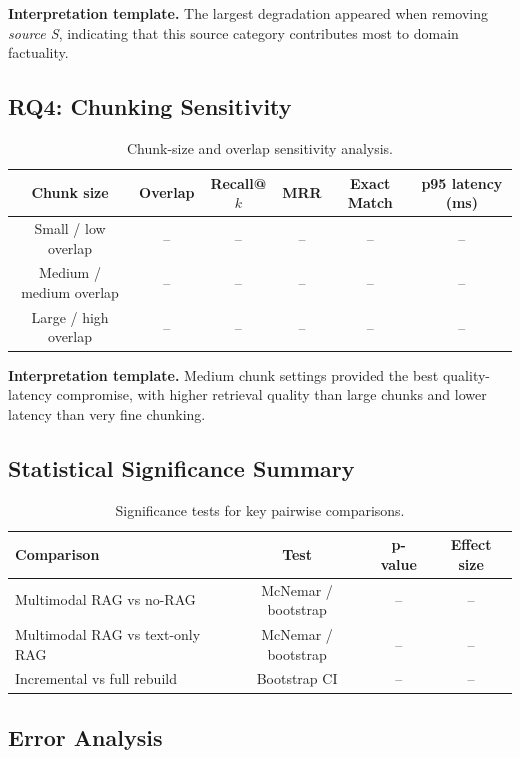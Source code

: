 \documentclass[11pt,a4paper]{article}
\begin{document}
\textbf{Interpretation template.} The largest degradation appeared when removing \emph{source S}, indicating that this source category contributes most to domain factuality.

\subsection{RQ4: Chunking Sensitivity}

\begin{table}[H]
\centering
\caption{Chunk-size and overlap sensitivity analysis.}
\label{tab:rq4-chunking}
\begin{tabular}{cccccc}
\toprule
Chunk size & Overlap & Recall@$k$ & MRR & Exact Match & p95 latency (ms) \\
\midrule
Small / low overlap & -- & -- & -- & -- & -- \\
Medium / medium overlap & -- & -- & -- & -- & -- \\
Large / high overlap & -- & -- & -- & -- & -- \\
\bottomrule
\end{tabular}
\end{table}

\textbf{Interpretation template.} Medium chunk settings provided the best quality-latency compromise, with higher retrieval quality than large chunks and lower latency than very fine chunking.

\subsection{Statistical Significance Summary}

\begin{table}[H]
\centering
\caption{Significance tests for key pairwise comparisons.}
\label{tab:stats-summary}
\begin{tabular}{lccc}
\toprule
Comparison & Test & p-value & Effect size \\
\midrule
Multimodal RAG vs no-RAG & McNemar / bootstrap & -- & -- \\
Multimodal RAG vs text-only RAG & McNemar / bootstrap & -- & -- \\
Incremental vs full rebuild & Bootstrap CI & -- & -- \\
\bottomrule
\end{tabular}
\end{table}

\subsection{Error Analysis}
\end{document}
